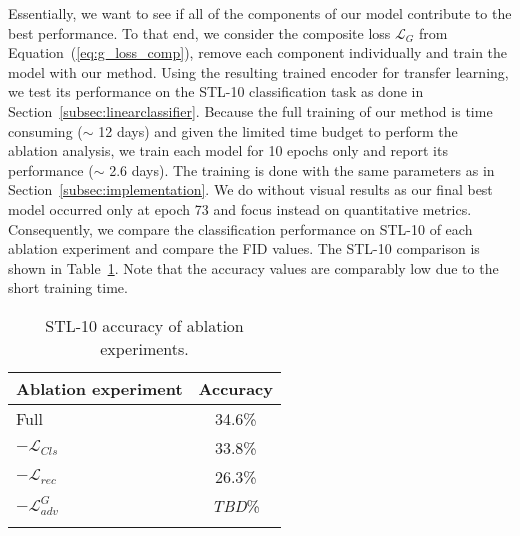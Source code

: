 \documentclass[a4paper,12pt]{report}
\begin{document}
Essentially, we want to see if all of the components of our model contribute to the best performance. To that end, we consider the composite loss $\mathcal{L}_{G}$ from Equation~(\ref{eq:g_loss_comp}), remove each component individually and train the model with our method. Using the resulting trained encoder for transfer learning, we test its performance on the STL-10 classification task as done in Section~\ref{subsec:linearclassifier}. Because the full training of our method is time consuming ($\sim$ 12 days) and given the limited time budget to perform the ablation analysis, we train each model for 10 epochs only and report its performance ($\sim$ 2.6 days). The training is done with the same parameters as in Section~\ref{subsec:implementation}. We do without visual results as our final best model occurred only at epoch 73 and focus instead on quantitative metrics. Consequently, we compare the classification performance on STL-10 of each ablation experiment and compare the FID values. The STL-10 comparison is shown in Table~\ref{tab:ablation_stl10}. Note that the accuracy values are comparably low due to the short training time.
\begin{table}[ht!]
\centering
\begin{tabular}{l c}
\Xhline{0.8pt}
\textbf{Ablation experiment} & \textbf{Accuracy} \\
\hline
Full & 34.6\% \\ %
$-\mathcal{L}_{Cls}$ & 33.8\% \\ %
$-\mathcal{L}_{rec}$ & 26.3\% \\ %
$-\mathcal{L}^G_{adv}$ & \textit{TBD}\% \\ %
\Xhline{0.8pt}
\end{tabular}
\caption{STL-10 accuracy of ablation experiments.} \label{tab:ablation_stl10}
\end{table}
\end{document}
